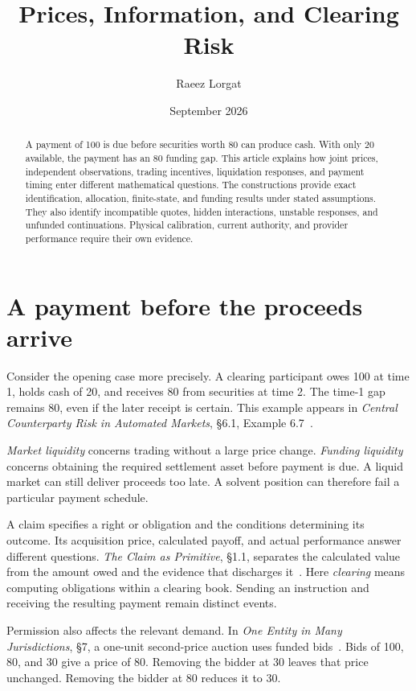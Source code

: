 \documentclass{momentum}
\title{Prices, Information, and Clearing Risk}
\author{Raeez Lorgat}
\date{September 2026}
\begin{document}
\maketitle

\begin{abstract}
A payment of 100 is due before securities worth 80 can produce cash. With only 20 available, the payment has an 80 funding gap. This article explains how joint prices, independent observations, trading incentives, liquidation responses, and payment timing enter different mathematical questions. The constructions provide exact identification, allocation, finite-state, and funding results under stated assumptions. They also identify incompatible quotes, hidden interactions, unstable responses, and unfunded continuations. Physical calibration, current authority, and provider performance require their own evidence.
\end{abstract}

\section{A payment before the proceeds arrive}

Consider the opening case more precisely. A clearing participant owes 100 at time 1, holds cash of 20, and receives 80 from securities at time 2. The time-1 gap remains 80, even if the later receipt is certain. This example appears in \emph{Central Counterparty Risk in Automated Markets}, \S6.1, Example 6.7~\cite{ccp}.

\emph{Market liquidity} concerns trading without a large price change. \emph{Funding liquidity} concerns obtaining the required settlement asset before payment is due. A liquid market can still deliver proceeds too late. A solvent position can therefore fail a particular payment schedule.

A claim specifies a right or obligation and the conditions determining its outcome. Its acquisition price, calculated payoff, and actual performance answer different questions. \emph{The Claim as Primitive}, \S1.1, separates the calculated value from the amount owed and the evidence that discharges it~\cite{claim}. Here \emph{clearing} means computing obligations within a clearing book. Sending an instruction and receiving the resulting payment remain distinct events.

Permission also affects the relevant demand. In \emph{One Entity in Many Jurisdictions}, \S7, a one-unit second-price auction uses funded bids~\cite{entity}. Bids of 100, 80, and 30 give a price of 80. Removing the bidder at 30 leaves that price unchanged. Removing the bidder at 80 reduces it to 30.
\end{document}
